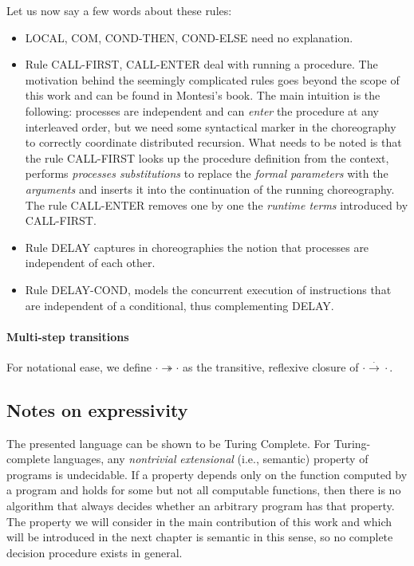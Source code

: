 \documentclass[12pt,a4paper,twoside]{book}
\begin{document}
Let us now say a few words about these rules:
\begin{itemize}
\item LOCAL, COM, COND-THEN, COND-ELSE need no explanation.
\item Rule CALL-FIRST, CALL-ENTER deal with running a procedure. The motivation behind the seemingly complicated rules goes beyond the scope of this work and can be found in Montesi's book\cite{montesi2023introduction}. The main intuition is the following: processes are independent and can \emph{enter} the procedure at any interleaved order, but we need some syntactical marker in the choreography to correctly coordinate distributed recursion. 
	What needs to be noted is that the rule CALL-FIRST looks up the procedure definition from the context, performs \textit{processes substitutions} to replace the \textit{formal parameters} with the \textit{arguments} and inserts it into the continuation of the running choreography. The rule CALL-ENTER removes one by one the \textit{runtime terms} introduced by CALL-FIRST.
\item Rule DELAY captures in choreographies the notion that processes are independent of each other.
\item Rule DELAY-COND, models the concurrent execution of instructions that are independent of a conditional, thus complementing DELAY.
\end{itemize}

\paragraph{Multi-step transitions}
For notational ease, we define $\cdot \twoheadrightarrow \cdot$ as the transitive, reflexive closure of $\cdot \xrightarrow{.} \cdot$.

\subsection{Notes on expressivity}
The presented language can be shown to be Turing Complete\cite{cruz2020core}.
For Turing-complete languages, any \emph{nontrivial} \emph{extensional} (i.e., semantic) property of programs is undecidable\cite{rice1953classes}. If a property depends only on the function computed by a program and holds for some but not all computable functions, then there is no algorithm that always decides whether an arbitrary program has that property.
The property we will consider in the main contribution of this work and which will be introduced in the next chapter is semantic in this sense, so no complete decision procedure exists in general.
\end{document}
